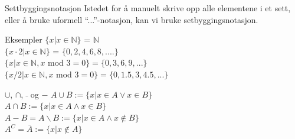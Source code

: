 \begin{frame}[fragile]{Settbyggingsnotasjon}
    Istedet for å manuelt skrive opp alle elementene i et sett, eller å bruke uformell \enquote{...}-notasjon, kan vi bruke setbyggingsnotasjon.
    \begin{block}{Eksempler}
        $\{ x | x \in \mathbb{N}\}$ = $\mathbb{N}$\\
        $\{ x \cdot 2 | x \in \mathbb{N}\}$ = $\{0, 2, 4, 6, 8, ....\}$\\
        $\{x | x \in \mathbb{N}, x$ mod $3 = 0 \} = \{0, 3, 6, 9, ...\}$\\
        $\{x/2 | x \in \mathbb{N}, x$ mod $3 = 0\} = \{0, 1.5, 3, 4.5, ...\}$
    \end{block}
    \pause
\end{frame} 

\begin{frame}{$\cup$, $\cap$, $\bar{}$ og $-$}
    $A \cup B := \{x | x \in A \lor x \in B\}$ \\
    $A \cap B := \{x | x \in A \land x \in B\}$\\
    $A - B = A \backslash B := \{x | x \in A\land  x \notin B\}$\\
    $A^C = \bar{A} := \{x | x \notin A\}$
    
    \begin{figure}%
        \centering
        \qquad
        \qquad
        \qquad
        \label{fig:example2}%
    \end{figure}
\end{frame}

